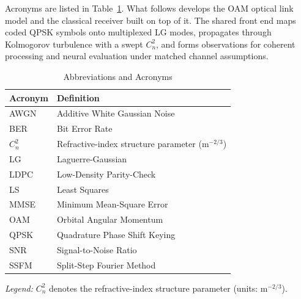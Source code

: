 \documentclass[journal]{IEEEtran}
\begin{document}
Acronyms are listed in Table~\ref{tab:abbreviations}. What follows develops the OAM optical link model and the classical receiver built on top of it. The shared front end maps coded QPSK symbols onto multiplexed LG modes, propagates through Kolmogorov turbulence with a swept $C_n^2$, and forms observations for coherent processing and neural evaluation under matched channel assumptions.

\begin{table}[htbp]
\centering
\caption{Abbreviations and Acronyms}
\label{tab:abbreviations}
\small
\renewcommand{\arraystretch}{1.1}
\begin{tabular}{ll}
\toprule
\textbf{Acronym} & \textbf{Definition} \\
\midrule
AWGN & Additive White Gaussian Noise \\
BER & Bit Error Rate \\
$C_n^2$ & Refractive-index structure parameter (m$^{-2/3}$) \\
LG & Laguerre-Gaussian \\
LDPC & Low-Density Parity-Check \\
LS & Least Squares \\
MMSE & Minimum Mean-Square Error \\
OAM & Orbital Angular Momentum \\
QPSK & Quadrature Phase Shift Keying \\
SNR & Signal-to-Noise Ratio \\
SSFM & Split-Step Fourier Method \\
\bottomrule
\end{tabular}
\vspace{0.5mm}
\parbox{0.95\columnwidth}{\footnotesize\textit{Legend:} $C_n^2$ denotes the refractive-index structure parameter (units: m$^{-2/3}$).}
\end{table}
\end{document}
